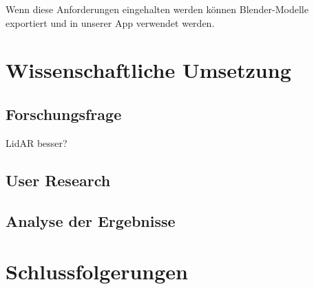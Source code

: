 \documentclass[12pt,a4paper]{article}
\begin{document}
Wenn diese Anforderungen eingehalten werden können Blender-Modelle exportiert und in unserer App verwendet werden.
\section{Wissenschaftliche Umsetzung}
\subsection{Forschungsfrage}
\glqq LidAR besser? \grqq{}
\subsection{User Research}
\subsection{Analyse der Ergebnisse}
\section{Schlussfolgerungen}
\end{document}
